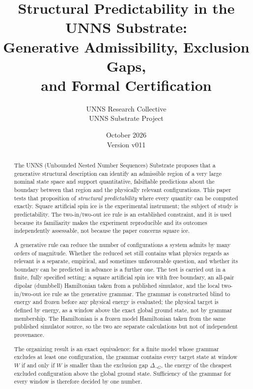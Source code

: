 \documentclass[11pt,a4paper]{article}
\title{\textbf{Structural Predictability in the UNNS Substrate:}\\[0.2em]
Generative Admissibility, Exclusion Gaps,\\and Formal Certification}
\author{UNNS Research Collective\\[0.2em]\small UNNS Substrate Project}
\date{October 2026 \\ \small Version v011}
\theoremstyle{plain}
\theoremstyle{definition}
\theoremstyle{remark}
\begin{document}
\maketitle
\thispagestyle{fancy}

\begin{abstract}
\noindent
The UNNS (Unbounded Nested Number Sequences) Substrate proposes that a generative structural description can identify an admissible region of a very large nominal state space and support quantitative, falsifiable predictions about the boundary between that region and the physically relevant configurations. This paper tests that proposition of \emph{structural predictability} where every quantity can be computed exactly. Square artificial spin ice is the experimental instrument; the subject of study is predictability. The two-in/two-out ice rule is an established constraint, and it is used because its familiarity makes the experiment reproducible and its outcomes independently assessable, not because the paper concerns square ice.

A generative rule can reduce the number of configurations a system admits by many orders of magnitude. Whether the reduced set still contains what physics regards as relevant is a separate, empirical, and sometimes unfavourable question, and whether its boundary can be predicted in advance is a further one. The test is carried out in a finite, fully specified setting: a square artificial spin ice with free boundary, an all-pair dipolar (dumbbell) Hamiltonian taken from a published simulator, and the local two-in/two-out ice rule as the generative grammar. The grammar is constructed blind to energy and frozen before any physical energy is evaluated; the physical target is defined by energy, as a window above the exact global ground state, not by grammar membership. The Hamiltonian is a frozen model Hamiltonian taken from the same published simulator source, so the two are separate calculations but not of independent provenance.

The organizing result is an exact equivalence: for a finite model whose grammar excludes at least one configuration, the grammar contains every target state at window $W$ if and only if $W$ is smaller than the exclusion gap $\Delta_{\neg G}$, the energy of the cheapest excluded configuration above the global ground state. Sufficiency of the grammar for every window is therefore decided by one number.


\end{abstract}
\end{document}
